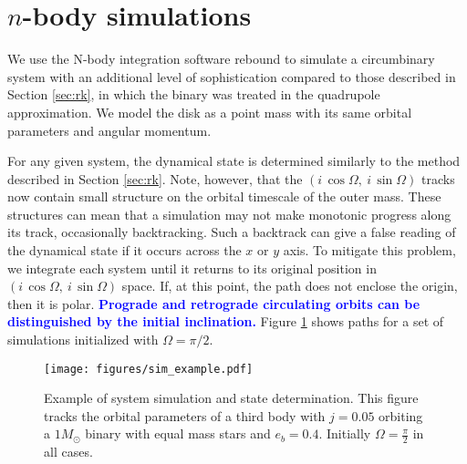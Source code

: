 \documentclass[twocolumn,linenumbers]{aastex631}
\newcommand{\RR}[1]{\textcolor{blue}{\bf#1}} %
\begin{document}
\section{$n$-body simulations}
\label{sec:reb}

We use the N-body integration software {\sc rebound} \citep{rebound} to simulate a circumbinary system with an additional level of sophistication compared to those described in Section \ref{sec:rk}, in which the binary was treated in the quadrupole approximation. We model the disk as a point mass with its same orbital parameters and angular momentum.

For any given system, the dynamical state is determined similarly to the method described in Section \ref{sec:rk}. Note, however, that the $(i\,\cos{\Omega},~i\,\sin{\Omega})$ tracks now contain small structure on the orbital timescale of the outer mass. These structures can mean that a simulation may not make monotonic progress along its track, occasionally backtracking. Such a backtrack can give a false reading of the dynamical state if it occurs across the $x$ or $y$ axis. To mitigate this problem, we integrate each system until it returns to its original position in $(i\,\cos{\Omega},~i\,\sin{\Omega})$ space. If, at this point, the path does not enclose the origin, then it is polar. \RR{Prograde and retrograde circulating orbits can be distinguished by the initial inclination.} Figure \ref{fig:sim_example} shows paths for a set of simulations initialized with $\Omega = \pi/2$.

\begin{figure}
    \begin{centering}
        \texttt{[image: figures/sim\_example.pdf]}
        \caption{Example of system simulation and state determination. This figure tracks the orbital parameters
        of a third body with $j=0.05$ orbiting a $1 M_\odot$ binary with equal mass stars and $e_b = 0.4$.
        Initially $\Omega = \frac{\pi}{2}$ in all cases.}
        \label{fig:sim_example}
    \end{centering}
\end{figure}
\end{document}
